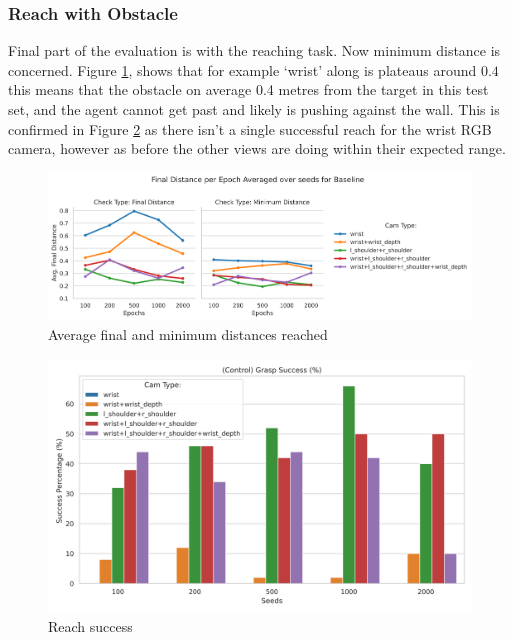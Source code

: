 \subsubsection{Reach with Obstacle}
Final part of the evaluation is with the reaching task. Now minimum distance is concerned. Figure \ref{fig:base-reach-dists}, shows that for example `wrist' along is plateaus around $0.4$ this means that the obstacle on average 0.4 metres from the target in this test set, and the agent cannot get past and likely is pushing against the wall. This is confirmed in Figure \ref{fig:base-reach-success} as there isn't a single successful reach for the wrist RGB camera, however as before the other views are doing within their expected range.

\begin{figure}[H]
  \centering
  \includegraphics[width=0.8\linewidth]{assets/evaluation/baseline/base-reach-dists.png}
  \caption{Average final and minimum distances reached}\label{fig:base-reach-dists}
\end{figure}

\begin{figure}[H]
  \centering
  \includegraphics[width=0.4\linewidth]{assets/evaluation/baseline/base-reach-success-cams-epochs.png}
  \caption{Reach success}\label{fig:base-reach-success}
\end{figure}